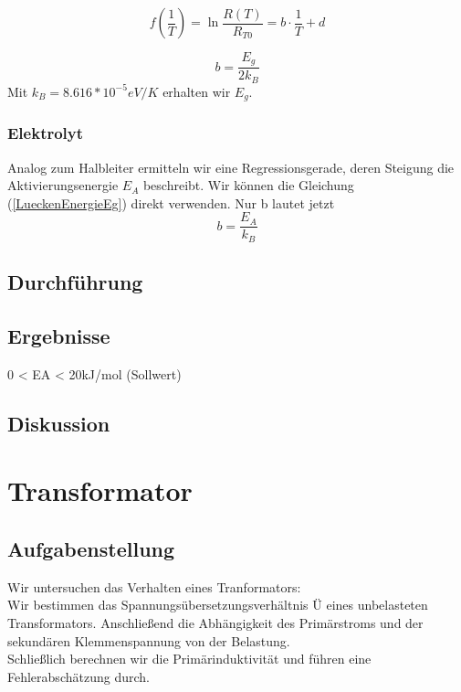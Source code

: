 \documentclass{article}
\begin{document}
\begin{equation}
\label{LueckenEnergieEg}
f(\frac{1}{T})=\ln\frac{R(T)}{R_{T0}}=b\cdot \frac{1}{T}+d
\end{equation}

\begin{equation}
\label{b-halbleiter}
b=\frac{E_g}{2k_B}
\end{equation}
Mit $k_{B}=8.616*10^{-5}eV/K$ erhalten wir $E_g$.

\subsubsection*{Elektrolyt}
Analog zum Halbleiter ermitteln wir eine Regressionsgerade, deren Steigung die Aktivierungsenergie $E_A$ beschreibt. Wir können die Gleichung (\ref{LueckenEnergieEg}) direkt verwenden. Nur b lautet jetzt
\begin{equation}
\label{b-elektrolyt}
b=\frac{E_A}{k_B}
\end{equation}

\subsection{Durchführung}
\subsection{Ergebnisse}
0 < EA < 20kJ/mol (Sollwert)
\subsection{Diskussion}


\newpage
\section{Transformator}

\subsection{Aufgabenstellung}
Wir untersuchen das Verhalten eines Tranformators:\\
Wir bestimmen das Spannungsübersetzungsverhältnis Ü eines unbelasteten Transformators. Anschließend die Abhängigkeit des Primärstroms und der sekundären Klemmenspannung von der Belastung. \\
Schließlich berechnen wir die Primärinduktivität und führen eine Fehlerabschätzung durch.
\end{document}
